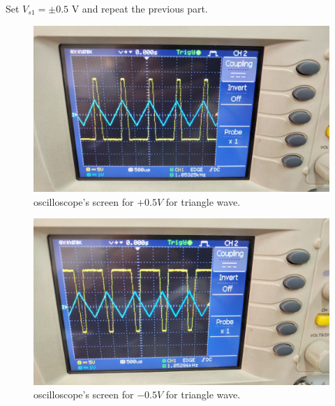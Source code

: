 \documentclass[11pt]{article}
\newcommand{\PicScale}{0.2}
\begin{document}
\begin{question}
\begin{subquestion}{Set $V_{s1}=\pm 0.5$ V and repeat the previous part.}
{\begin{figure}[H]
                \centering
                \includegraphics[scale=\PicScale,angle=0]{Fig/51.jpeg}
                \caption{oscilloscope's screen for $+0.5V$ for triangle wave.}
            \end{figure}
            \begin{figure}[H]
                \centering
                \includegraphics[scale=\PicScale,angle=0]{Fig/52.jpeg}
                \caption{oscilloscope's screen for $-0.5V$ for triangle wave.}
            \end{figure}
            }
        \end{subquestion}


\end{question}
\end{document}
